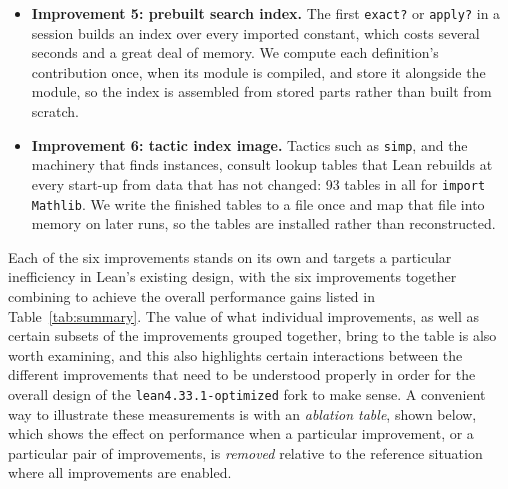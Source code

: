 \documentclass{article}
\newcommand{\Lean}{Lean\xspace}      %
\newcommand{\altlean}{\texttt{lean4.33.1-\allowbreak optimized}\xspace}
\begin{document}
\begin{itemize}
\item \textbf{Improvement 5: prebuilt search index.} The first \texttt{exact?} or \texttt{apply?} in a session builds an index over every imported constant, which costs several seconds and a great deal of memory. We compute each definition's contribution once, when its module is compiled, and store it alongside the module, so the index is assembled from stored parts rather than built from scratch.

\item \textbf{Improvement 6: tactic index image.} Tactics such as \texttt{simp}, and the machinery that finds instances, consult lookup tables that \Lean rebuilds at every start-up from data that has not changed: 93 tables in all for \texttt{import Mathlib}. We write the finished tables to a file once and map that file into memory on later runs, so the tables are installed rather than reconstructed.
\end{itemize}

Each of the six improvements stands on its own and targets a particular inefficiency in \Lean's existing design, with the six improvements together combining to achieve the overall performance gains listed in Table~\ref{tab:summary}. The value of what individual improvements, as well as certain subsets of the improvements grouped together, bring to the table is also worth examining, and this also highlights certain interactions between the different improvements that need to be understood properly in order for the overall design of the \altlean fork to make sense. A convenient way to illustrate these measurements is with an \emph{ablation table}, shown below, which shows the effect on performance when a particular improvement, or a particular pair of improvements, is \emph{removed} relative to the reference situation where all improvements are enabled.
\end{document}
